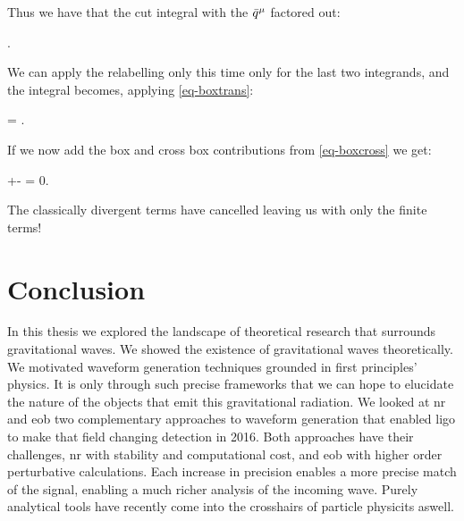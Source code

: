 \documentclass[
  10pt,
  a4paper,
  DIV=11,
  numbers=noendperiod,
  oneside]{scrreprt}
\let\[\relax \let\]\relax %
\DeclareRobustCommand{\[}{\begin{equation}}
\DeclareRobustCommand{\]}{\end{equation}}
\begin{document}
Thus we have that the cut integral with the \(\bar{q}_{}{}^{\mu}\) factored out:

\[
\int \dn[4]{\bar{\ell}}\Half{} .
\]

We can apply the relabelling only this time only for the last two
integrands, and the integral becomes, applying \ref{eq-boxtrans}:

\[
\int \dn[4]{\bar{\ell}}\Half{}= \int \dn[4]{\bar{\ell}}  .
\]

If we now add the box and cross box contributions from \ref{eq-boxcross}
we get:

\[
\int \dn[4]{\bar{\ell}}+-  =  0.
\]

The classically divergent terms have cancelled leaving us with only the
finite terms!


\hypertarget{conclusion}{%
\chapter{Conclusion}\label{conclusion}}

In this thesis we explored the landscape of theoretical research that
surrounds gravitational waves. We showed the existence of gravitational
waves theoretically. We motivated waveform generation techniques
grounded in first principles' physics. It is only through such precise
frameworks that we can hope to elucidate the nature of the objects that
emit this gravitational radiation. We looked at \gls{nr} and \gls{eob}
two complementary approaches to waveform generation that enabled
\gls{ligo} to make that field changing detection in 2016. Both
approaches have their challenges, \gls{nr} with stability and
computational cost, and \gls{eob} with higher order perturbative
calculations. Each increase in precision enables a more precise match of
the signal, enabling a much richer analysis of the incoming wave. Purely
analytical tools have recently come into the crosshairs of particle
physicits aswell.
\end{document}
